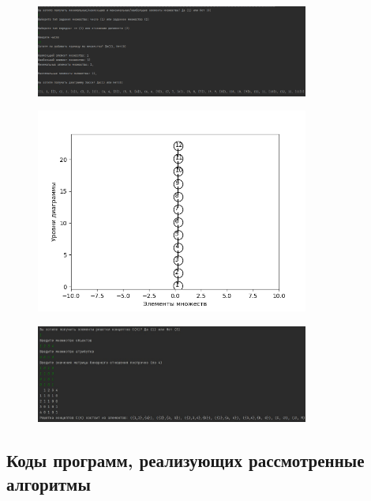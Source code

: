 \documentclass[bachelor, och, labwork]{shiza}
\begin{document}
        \begin{figure}[H]
            \centering
            \includegraphics[width=0.8\textwidth]{pic/6.png}
            \caption{}
        \end{figure}

        \begin{figure}[H]
            \centering
            \includegraphics[width=0.8\textwidth]{pic/7.png}
            \caption{}
        \end{figure}

        \begin{figure}[H]
            \centering
            \includegraphics[width=0.8\textwidth]{pic/8.png}
            \caption{}
        \end{figure}
    
    \subsection{Коды программ, реализующих рассмотренные алгоритмы}
\end{document}
